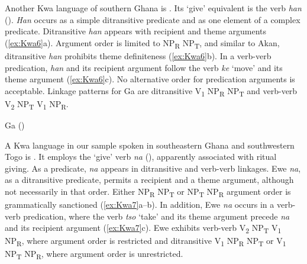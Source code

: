 \documentclass[output=paper,colorlinks,citecolor=brown]{langscibook}
\begin{document}
Another Kwa language of southern Ghana is . Its ‘give’ equivalent is the verb \textit{han} (\cite{Dakubu2003, Dakubu2004, Dakubu2009}). \textit{Han} occurs as a simple ditransitive predicate and as one element of a complex predicate. Ditransitive \textit{han} appears with recipient and theme arguments (\ref{ex:Kwa6}a). Argument order is limited to NP\textsubscript{R} NP\textsubscript{T}, and similar to Akan, ditransitive \textit{han} prohibits theme definiteness (\ref{ex:Kwa6}b). In a verb-verb predication, \textit{han} and its recipient argument follow the verb \textit{ke} ‘move’ and its theme argument (\ref{ex:Kwa6}c). No alternative order for predication arguments is acceptable. Linkage patterns for Ga are ditransitive V\textsubscript{1} NP\textsubscript{R} NP\textsubscript{T} and verb-verb V\textsubscript{2} NP\textsubscript{T} V\textsubscript{1} NP\textsubscript{R}.

\ea \label{ex:Kwa6} Ga (\citealt[116-117]{Dakubu2004})
\begin{xlist}
\end{xlist}
\z

A Kwa language in our sample spoken in southeastern Ghana and southwestern Togo is . It employs the ‘give’ verb \textit{na} (\citealt{Dzameshie2004}), apparently associated with ritual giving. As a predicate, \textit{na} appears in ditransitive and verb-verb linkages. Ewe \textit{na}, as a ditransitive predicate, permits a recipient and a theme argument, although not necessarily in that order. Either NP\textsubscript{R} NP\textsubscript{T} or NP\textsubscript{T} NP\textsubscript{R} argument order is grammatically sanctioned (\ref{ex:Kwa7}a--b). In addition, Ewe \textit{na} occurs in a verb-verb predication, where the verb \textit{tso} ‘take’ and its theme argument precede \textit{na} and its recipient argument (\ref{ex:Kwa7}c). Ewe exhibits verb-verb V\textsubscript{2} NP\textsubscript{T} V\textsubscript{1} NP\textsubscript{R}, where argument order is restricted and ditransitive V\textsubscript{1} NP\textsubscript{R} NP\textsubscript{T} or V\textsubscript{1} NP\textsubscript{T} NP\textsubscript{R}, where argument order is unrestricted.\largerpage
\end{document}
